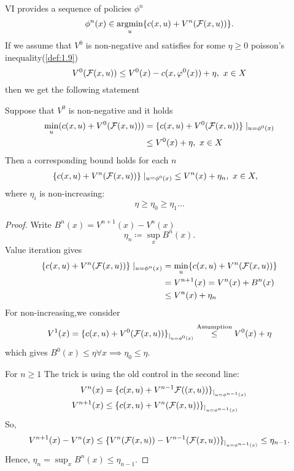 VI provides a sequence of policies \(\phi^n\)
\[\phi^n(x)\in\operatorname*{\text{argmin}}_{u}\{c(x,u)+V^n(\mathcal{F}(x,u))\}.\]
If we assume that \(V^0\) is non-negative and satisfies for some 
\(\eta\geq 0\) poisson's inequality(\ref{def:1.9})
\[V^0(\cF(x,u))\leq V^0(x)-c(x,\varphi^0(x))+\eta,\ x\in X\]
then we get the following statement 
\begin{proposition}\label{prop:1.16}
    Suppose that \(V^0\) is non-negative and it holds 
    \begin{align*}
        \min_u (c(x,u)+V^0(\mathcal{F}(x,u)))&=\{c(x,u)+V^0(\mathcal{F}(x,u))\}\mid_{u=\phi^0(x)}\\
        &\leq V^0(x)+\eta,\ x\in X
    \end{align*}
    Then a corresponding bound holds for each \(n\)
    \begin{align*}
        \{c(x,u)+V^n(\mathcal{F}(x,u))\}\mid_{u=\phi^0(x)} & \leq V^n(x)+\eta_n,\ x\in X,
    \end{align*}
    where \(\eta_i\) is non-increasing:
    \[\eta\geq \eta_0\geq \eta_1\dots\]
\end{proposition}

\begin{proof}
    Write \(B^n(x)=V^{n+1}(x)-V^n(x)\)
    \[\eta_n\coloneqq \sup_x B^n(x).\]
    Value iteration gives 
    \begin{align*}
        \{c(x,u)+V^n(\mathcal{F}(x,u))\}\mid_{u=\phi^n(x)}&=\min_u\{c(x,u)+V^n(\mathcal{F}(x,u))\}\\
        &=V^{n+1}(x)=V^n(x)+B^n(x)\\
        &\leq V^n(x)+\eta_n 
    \end{align*}
    For non-increasing,we consider 
    \begin{align*}
        V^1(x)=\{c(x,u)+V^0(\mathcal{F}(x,u))\}_{|_{u=\phi^0(x)}}\stackrel{\text{Assumption}}{\leq} V^0(x)+\eta
    \end{align*}
    which gives \(B^0(x)\leq \eta\forall x\implies\eta_0\leq \eta\).

    For \(n\geq 1\) 
    The trick is using the old control in the second line:
    \begin{align*}
        V^n(x)&=\{c(x,u)+V^{n-1}\mathcal{F}((x,u))\}_{|_{u=\phi^{n-1}(x)}}\\
        V^{n+1}(x) &\leq \{c(x,u)+V^n(\mathcal{F}(x,u))\}_{|_{u=\phi^{n-1}(x)}}
    \end{align*}
    So, 
    \[V^{n+1}(x)-V^{n}(x)\leq \{V^n(\mathcal{F}(x,u))-V^{n-1}(\mathcal{F}(x,u))\}_{|_{u=\phi^{n-1}(x)}}\leq \eta_{n-1}.\]
    Hence, \(\eta_n=\sup_x B^n(x)\leq \eta_{n-1}\).
\end{proof}

